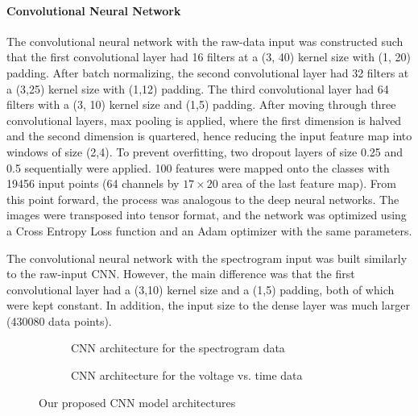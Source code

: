 \documentclass[fleqn,10pt]{SelfArx} %
\begin{document}
\paragraph{Convolutional Neural Network} 
The convolutional neural network with the raw-data input was constructed such that the first convolutional layer had 16 filters at a (3, 40) kernel size with (1, 20) padding. After batch normalizing, the second convolutional layer had 32 filters at a (3,25) kernel size with (1,12) padding. The third convolutional layer had 64 filters with a (3, 10) kernel size and (1,5) padding. After moving through three convolutional layers, max pooling is applied, where the first dimension is halved and the second dimension is quartered, hence reducing   the input feature map into windows of size (2,4). To prevent overfitting, two dropout layers of size 0.25 and 0.5 sequentially were applied. 100 features were mapped onto the classes with 19456 input points (64 channels by $17\times20$ area of the last feature map). 
From this point forward, the process was analogous to the deep neural networks. The images were transposed into tensor format, and the network was optimized using a Cross Entropy Loss function and an Adam optimizer with the same parameters.

The convolutional neural network with the spectrogram input was built  similarly to the raw-input CNN. However, the main difference was that the first convolutional layer had a (3,10) kernel size and a (1,5) padding, both of which were kept constant. In addition, the input size to the dense layer was much larger (430080 data points).

\begin{figure*}
    \centering
    \begin{subfigure}{\linewidth}
        \centering
        
        \caption{CNN architecture for the spectrogram data}
        \label{fig:CNN_spec_model}
    \end{subfigure}

    \begin{subfigure}{\linewidth}
        \centering
        
        \caption{CNN architecture for the voltage vs. time data}
        \label{fig:CNN_VT_model}
    \end{subfigure}

    \caption{Our proposed CNN model architectures}
    \label{fig:CNN_models}
\end{figure*}
\end{document}
